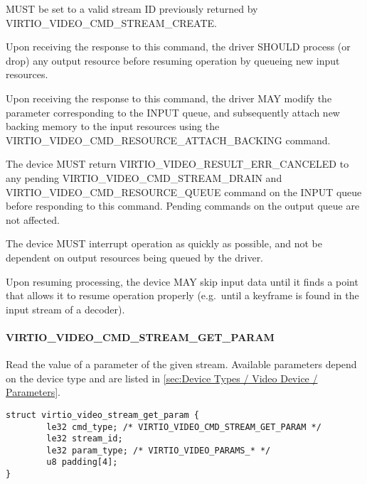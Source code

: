 
 MUST be set to a valid stream ID previously returned
by VIRTIO_VIDEO_CMD_STREAM_CREATE.

Upon receiving the response to this command, the driver SHOULD process
(or drop) any output resource before resuming operation by queueing new
input resources.

Upon receiving the response to this command, the driver MAY modify the
 parameter corresponding to
the INPUT queue, and subsequently attach new backing memory to the input
resources using the VIRTIO_VIDEO_CMD_RESOURCE_ATTACH_BACKING
command.


The device MUST return VIRTIO_VIDEO_RESULT_ERR_CANCELED to any
pending VIRTIO_VIDEO_CMD_STREAM_DRAIN and
VIRTIO_VIDEO_CMD_RESOURCE_QUEUE command on the INPUT queue before
responding to this command. Pending commands on the output queue are not
affected.

The device MUST interrupt operation as quickly as possible, and not be
dependent on output resources being queued by the driver.

Upon resuming processing, the device MAY skip input data until it finds
a point that allows it to resume operation properly (e.g.~until a
keyframe is found in the input stream of a decoder).

\paragraph{VIRTIO_VIDEO_CMD_STREAM_GET_PARAM}\label{sec:Device Types / Video Device / Device Operation / Device Operation: Stream commands / VIRTIO_VIDEO_CMD_STREAM_GET_PARAM}

Read the value of a parameter of the given stream. Available parameters
depend on the device type and are listed in
\ref{sec:Device Types / Video Device / Parameters}.

\begin{lstlisting}
struct virtio_video_stream_get_param {
        le32 cmd_type; /* VIRTIO_VIDEO_CMD_STREAM_GET_PARAM */
        le32 stream_id;
        le32 param_type; /* VIRTIO_VIDEO_PARAMS_* */
        u8 padding[4];
}
\end{lstlisting}


